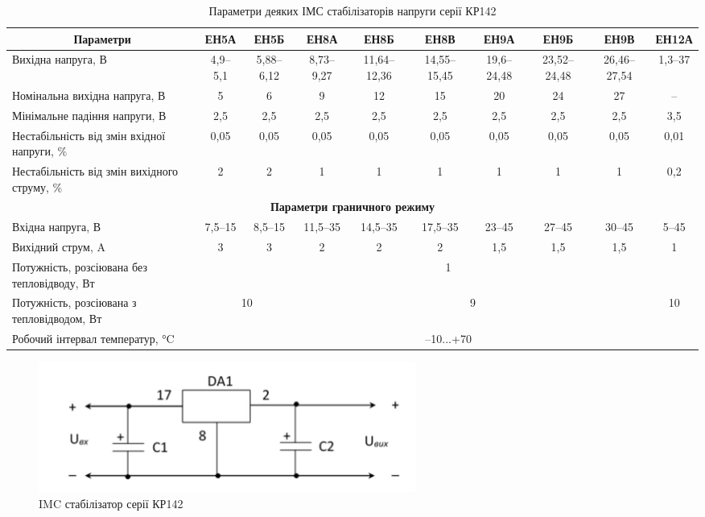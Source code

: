 \documentclass[main.tex]{subfiles}
\begin{document}
\begin{table}[H]
  \centering
  \caption{Параметри деяких ІМС стабілізаторів напруги серії КР142}
  \label{tab:kp142}
  \footnotesize
  \begin{tabular}{@{}|p{2.2cm}|c|c|c|c|c|c|c|c|c|@{}}
    \hline
    \multicolumn{1}{|c|}{\textbf{Параметри}} &
    \textbf{ЕН5А} & \textbf{ЕН5Б} & \textbf{ЕН8А} &
    \textbf{ЕН8Б} & \textbf{ЕН8В} & \textbf{ЕН9А} &
    \textbf{ЕН9Б} & \textbf{ЕН9В} & \textbf{ЕН12А} \\ \hline
    Вихідна напруга, В
      & 4,9--5,1   & 5,88--6,12  & 8,73--9,27  &
        11,64--12,36 & 14,55--15,45 & 19,6--24,48 &
        23,52--24,48 & 26,46--27,54 & 1,3--37       \\ \hline
    Номінальна вихідна напруга, В
      & 5 & 6 & 9  & 12 & 15 & 20 & 24 & 27 & -- \\ \hline
    Мінімальне падіння напруги, В
      & 2,5 & 2,5 & 2,5 & 2,5 & 2,5 & 2,5 & 2,5 & 2,5 & 3,5 \\ \hline
    Нестабільність від змін вхідної напруги, \%
      &  0,05 & 0,05 & 0,05 & 0,05 & 0,05 & 0,05 & 0,05 & 0,05 & 0,01 \\ \hline
    Нестабільність від змін вихідного струму, \%
      & 2 & 2 & 1 & 1 & 1 & 1 & 1 & 1 & 0,2 \\ \hline

    \multicolumn{10}{|c|}{\textbf{Параметри граничного режиму}} \\ \hline
    Вхідна напруга, В
      & 7,5--15  & 8,5--15   & 11,5--35 & 14,5--35 &
        17,5--35 & 23--45    & 27--45    & 30--45    & 5--45  \\ \hline
    Вихідний струм, A
      & 3 & 3 & 2 & 2 & 2 & 1,5 & 1,5  & 1,5 & 1 \\ \hline
    Потужність, розсіювана без тепловідводу, Вт
      & \multicolumn{9}{c|}{1} \\ \hline
    Потужність, розсіювана з тепловідводом, Вт
      & \multicolumn{2}{c|}{10} & \multicolumn{6}{c|}{9} & 10 \\ \hline
    Робочий інтервал температур, °C
      & \multicolumn{9}{c|}{--10...+70} \\ \hline
  \end{tabular}
  \normalsize
\end{table}

\begin{figure}[ht]
    \centering
    \includegraphics[width=0.6\textwidth]{images/IMC1.png}
    \caption{IMC стабілізатор серії КР142}
    \label{fig:stabilizer_example1}
\end{figure}
\end{document}
